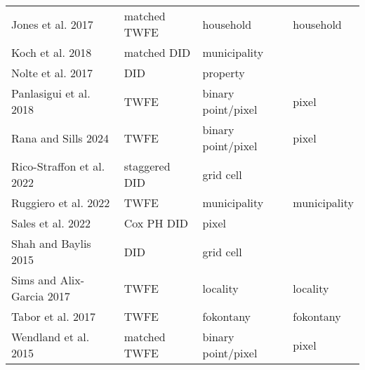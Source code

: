\begin{table}[H]
\begin{tabular}[t]{llll}
Jones et al. 2017 & matched TWFE & household & household\\
Koch et al. 2018 & matched DID & municipality & \\
Nolte et al. 2017 & DID & property & \\
Panlasigui et al. 2018 & TWFE & binary point/pixel & pixel\\
Rana and Sills 2024 & TWFE & binary point/pixel & pixel\\
Rico-Straffon et al. 2022 & staggered DID & grid cell & \\
Ruggiero et al. 2022 & TWFE & municipality & municipality\\
Sales et al. 2022 & Cox PH DID & pixel & \\
Shah and Baylis 2015 & DID & grid cell & \\
Sims and Alix-Garcia 2017 & TWFE & locality & locality\\
Tabor et al. 2017 & TWFE & fokontany & fokontany\\
Wendland et al. 2015 & matched TWFE & binary point/pixel & pixel\\
\bottomrule
\end{tabular}
\end{table}
